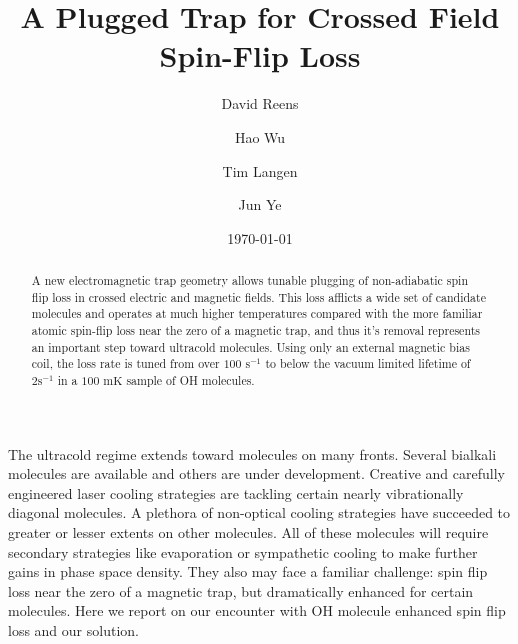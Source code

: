\documentclass[%
 reprint,
 amsmath,amssymb,
 aps,
prl,
]{revtex4-1}
\begin{document}

\title{A Plugged Trap for Crossed Field Spin-Flip Loss}%


\author{David Reens}%
\author{Hao Wu}
\author{Tim Langen}%
\author{Jun Ye}
%

\date{\today}%


\begin{abstract}
A new electromagnetic trap geometry allows tunable plugging of non-adiabatic spin flip loss in crossed electric and magnetic fields. This loss afflicts a wide set of candidate molecules and operates at much higher temperatures compared with the more familiar atomic spin-flip loss near the zero of a magnetic trap, and thus it's removal represents an important step toward ultracold molecules. Using only an external magnetic bias coil, the loss rate is tuned from over $100 \text{ s}^{-1} $ to below the vacuum limited lifetime of $2 \text{s}^{-1}$ in a $100 \text{ mK}$ sample of OH molecules.
\end{abstract}


\maketitle


%
%
The ultracold regime extends toward molecules on many fronts. Several bialkali molecules are available and others are under development. Creative and carefully engineered laser cooling strategies are tackling certain nearly vibrationally diagonal molecules. A plethora of non-optical cooling strategies have succeeded to greater or lesser extents on other molecules. All of these molecules will require secondary strategies like evaporation or sympathetic cooling to make further gains in phase space density. They also may face a familiar challenge: spin flip loss near the zero of a magnetic trap, but dramatically enhanced for certain molecules. Here we report on our encounter with OH molecule enhanced spin flip loss and our solution.
\end{document}
